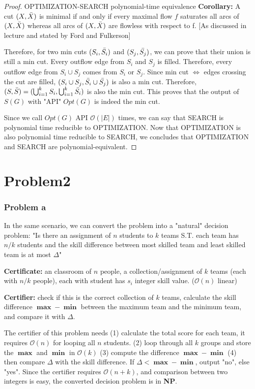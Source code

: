 \documentclass[openany]{article}
\begin{document}
\begin{proof}{}{OPTIMIZATION-SEARCH polynomial-time equivalence}
\textbf{Corollary: } A cut $(X,\Bar{X})$ is minimal if and only if every maximal flow $f$ saturates all arcs of $(X,\Bar{X})$ whereas all arcs of $(X,\Bar{X})$ are flowless with respect to f. [As discussed in lecture and stated by Ford and Fulkerson]

Therefore, for two min cuts $(S_i,\Bar{S_i})$ and $(S_j, \Bar{S_j})$, we can prove that their union is still a min cut. Every outflow edge from $S_i$ and $S_j$ is filled. Therefore, every outflow edge from $S_i \cup S_j$ comes from $S_i$ or $S_j$. Since min cut $\Leftrightarrow$ edges crossing the cut are filled, $(S_i \cup S_j, \Bar{S_i} \cup \Bar{S_j})$ is also a min cut. Therefore, $(S,\Bar{S}) = (\bigcup_{i=1}^{k}{S_i},\bigcup_{i=1}^{k}\Bar{S_i})$ is also the min cut. This proves that the output of $S(G)$ with "API" $Opt(G)$ is indeed the min cut.

Since we call $Opt(G)$ API $\mathcal{O}(|E|)$ times, we can say that SEARCH is polynomial time reducible to OPTIMIZATION. Now that OPTIMIZATION is also polynomial time reducible to SEARCH, we concludes that OPTIMIZATION and SEARCH are polynomial-equivalent.


\end{proof}


\section*{Problem2}
\subsubsection*{Problem a}
In the same scenario, we can convert the problem into a "natural" decision problem: "Is there an assignment of $n$ students to $k$ teams S.T. each team has $n/k$ students and the skill difference between most skilled team and least skilled team is at most $\Delta$" 

\textbf{Certificate:} an classroom of $n$ people, a collection/assignment of $k$ teams (each with $n/k$ people), each with student has $s_i$ integer skill value. ($\mathcal{O}(n)$ linear)

\textbf{Certifier:} check if this is the correct collection of $k$ teams, calculate the skill difference $\mathbf{\max}-\mathbf{\min}$ between the maximum team and the minimum team, and compare it with $\Delta$.

The certifier of this problem needs (1) calculate the total score for each team, it requires $\mathcal{O}(n)$ for looping all $n$ students. (2) loop through all $k$ groups and store the $\mathbf{\max}$ and $\mathbf{\min}$ in $\mathcal{O}(k)$ (3) compute the difference $\mathbf{\max} - \mathbf{\min}$ (4) then compare $\Delta$ with the skill difference. If $\Delta < \mathbf{\max} - \mathbf{\min}$, output "no", else "yes". Since the certifier requires $\mathcal{O}(n+k)$, and comparison between two integers is easy, the converted decision problem is in \textbf{NP}.
\end{document}

